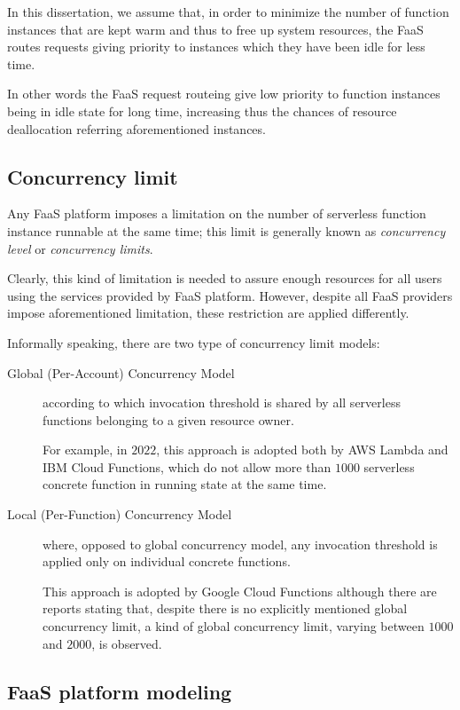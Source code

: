 \documentclass[12pt,a4paper]{report}
\begin{document}
In this dissertation, we assume that, in order to minimize the number of
function instances that are kept warm and thus to free up system resources, the FaaS routes requests giving priority to instances which they have been idle for less time.

In other words the FaaS request routeing give low priority to function instances being in idle state for long time, increasing thus the chances of resource deallocation referring aforementioned instances.

\subsection{Concurrency limit}

Any FaaS platform imposes a limitation on the number of serverless function instance runnable at the same time; this limit is generally known as \textit{concurrency level} or \textit{concurrency limits}. 

Clearly, this kind of limitation is needed to assure enough resources for all users using the services provided by FaaS platform. However, despite all FaaS providers impose aforementioned limitation, these restriction are applied differently.

Informally speaking, there are two type of concurrency limit models:

\begin{description}
	\item[Global (Per-Account) Concurrency Model] according to which invocation threshold is shared by all serverless functions belonging to a given resource owner. 
	
	For example, in $2022$, this approach is adopted both by AWS Lambda and IBM Cloud Functions, which do not allow more than $1000$ serverless concrete function in running state at the same time.
	
	\item[Local (Per-Function) Concurrency Model] where, opposed to global concurrency model, any invocation threshold is applied only on individual concrete functions. 
	
	This approach is adopted by Google Cloud Functions although there are reports stating that, despite there is no explicitly mentioned global concurrency limit, a kind of global concurrency limit, varying between $1000$ and $2000$, is observed.
	
\end{description}

\subsection{FaaS platform modeling}
\end{document}
